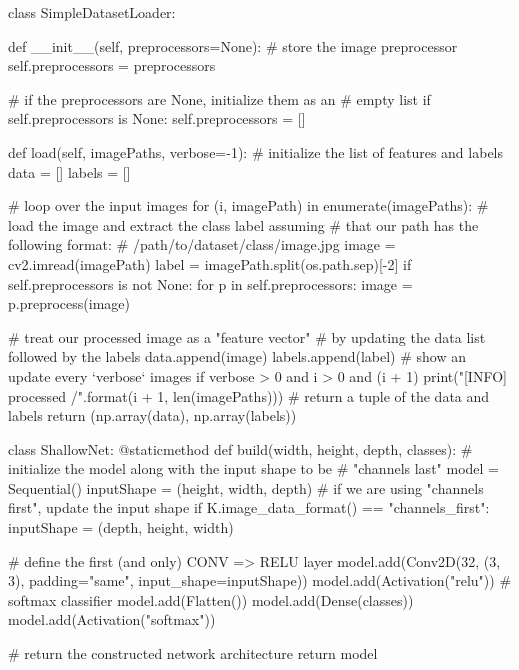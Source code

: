 \begin{python}
class SimpleDatasetLoader:
    
    def __init__(self, preprocessors=None):
        # store the image preprocessor
        self.preprocessors = preprocessors

        # if the preprocessors are None, initialize them as an
        # empty list
        if self.preprocessors is None:
            self.preprocessors = []
            
    def load(self, imagePaths, verbose=-1):
        # initialize the list of features and labels
        data = []
        labels = []

        # loop over the input images
        for (i, imagePath) in enumerate(imagePaths):
            # load the image and extract the class label assuming
            # that our path has the following format:
            # /path/to/dataset/{class}/{image}.jpg
            image = cv2.imread(imagePath)
            label = imagePath.split(os.path.sep)[-2]
            if self.preprocessors is not None:
                for p in self.preprocessors:
                    image = p.preprocess(image)
            
            # treat our processed image as a "feature vector" # by updating the data list followed by the labels 
            data.append(image)
            labels.append(label)
            # show an update every ‘verbose‘ images
            if verbose > 0 and i > 0 and (i + 1) %
                print("[INFO] processed {}/{}".format(i + 1, len(imagePaths)))
            # return a tuple of the data and labels
        return (np.array(data), np.array(labels))


class ShallowNet:
    @staticmethod
    def build(width, height, depth, classes):
        # initialize the model along with the input shape to be
        # "channels last"
        model = Sequential()
        inputShape = (height, width, depth)
        # if we are using "channels first", update the input shape
        if K.image_data_format() == "channels_first":
            inputShape = (depth, height, width)
        
        # define the first (and only) CONV => RELU layer
        model.add(Conv2D(32, (3, 3), padding="same", input_shape=inputShape))
        model.add(Activation("relu"))
        # softmax classifier
        model.add(Flatten())
        model.add(Dense(classes))
        model.add(Activation("softmax"))

        # return the constructed network architecture
        return model


\end{python}

